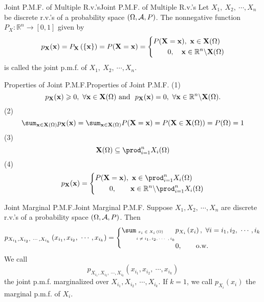 \documentclass{elegantbook}
\begin{document}
\begin{definition}{Joint P.M.F. of Multiple R.v.'s}{Joint P.M.F. of Multiple R.v.'s}
Let $X_1,\ X_2,\ \cdots,X_n$ be discrete r.v.'s of a probability space $(\Omega,\mathcal{A}, P)$. The nonnegative function $P_X:\mathbb{R}^n\rightarrow[0,1]$ given by 
\[p_{\mathbf{X}}(\mathbf{x}) = P_{\mathbf{X}}\left( \left\{ \mathbf{x}\right\} \right) = P(\mathbf{X} =\mathbf{x} ) = \left\{ \begin{aligned}
&P(\mathbf{X} =\mathbf{x} ),\ \mathbf{x}\in\mathbf{X}(\Omega) \\
&\qquad0,\quad\mathbf{x}\in \mathbb{R}^{n}\backslash\mathbf{X}(\Omega) \\
\end{aligned} \right.\]
is called the joint p.m.f. of $X_1,\ X_2,\ \cdots,X_n$.
\end{definition}

\begin{remark}{Properties of Joint P.M.F.}{Properties of Joint P.M.F.}
(1)
\[p_{\mX}(\mx) \gs 0,\ \forall \mx\in \mX( \Omega )\ \mathrm{\text{and}}\mathrm{\ }\ p_{\mX}(\mx) = 0,\ \forall\mx \in \mathbb{R}^{n}\backslash \mX(\Omega).\]
(2)
\[\sum_{\mx\in \mX(\Omega)}{p_{\mX}(\mx)} = \sum_{\mx\in \mX(\Omega)}{P(\mX=\mx)} = P(\mX \in \mX(\Omega) ) = P( \Omega ) = 1\]
(3)
\[\mX(\Omega) \subseteq \prod_{i = 1}^{n}{X_{i}(\Omega)}\]
(4)
\[p_{\mX}(\mx) = \left\{ \begin{aligned}
&P(\mX =\mx),\ \mx\in\prod_{i = 1}^{n}X_{i}(\Omega) \\
&\qquad0,\qquad\mx  \in \mathbb{R}^{n}\backslash\prod_{i = 1}^{n}X_{i}( \Omega) \\
\end{aligned} \right.\]
\end{remark}

\begin{theorem}{Joint Marginal P.M.F.}{Joint Marginal P.M.F.}
Suppose $X_1,X_2,\ \cdots,X_n$ are discrete r.v.'s of a probability space $(\Omega,\mathcal{A}, P)$. Then 
\[p_{X_{i_{1}},X_{i_{2}},\ \cdots,X_{i_{k}}}\left( x_{i_{1}},x_{i_{2}},\ \cdots,x_{i_{k}} \right) = \left\{ \begin{aligned}
\sum_{\mbox{\tiny$\begin{aligned}
&x_{i} \in X_{i}\left( \Omega \right) \\
i &\neq i_{1},i_{2},\cdots\ ,i_{k} \\
\end{aligned}$}} & {p_{X_i}\left( x_i \right),\ \forall i = i_{1},i_{2},\ \cdots,i_{k}} \\
&0,\qquad\mathrm{\text{o.w.}} \\
\end{aligned} \right.\]
We call $$p_{X_{i_1},X_{i_2},\ \cdots,X_{i_k}}\left(x_{i_1},x_{i_2},\ \cdots,x_{i_k}\right)$$ the joint p.m.f. marginalized over $X_{i_1},X_{i_2},\ \cdots,X_{i_k}$.  If $k=1$, we call $p_{X_i}(x_i)$ the marginal p.m.f. of $X_i$.
\end{theorem}
\end{document}
